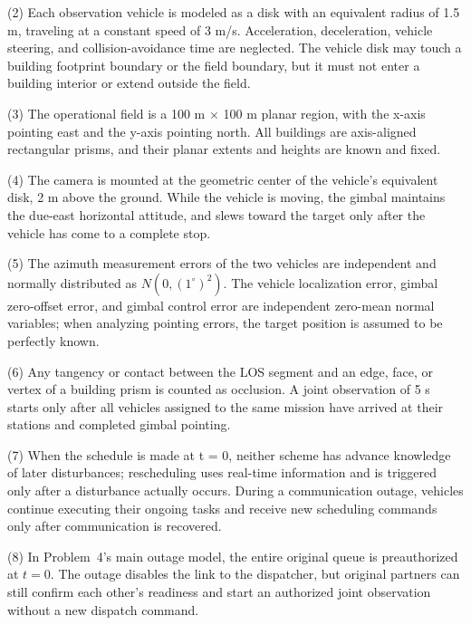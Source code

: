\documentclass{swmcmthesis}
\begin{document}
(2) Each observation vehicle is modeled as a disk with an equivalent radius of 1.5 m, traveling at a constant speed of 3 m/s. Acceleration, deceleration, vehicle steering, and collision-avoidance time are neglected. The vehicle disk may touch a building footprint boundary or the field boundary, but it must not enter a building interior or extend outside the field.

(3) The operational field is a 100 m × 100 m planar region, with the x-axis pointing east and the y-axis pointing north. All buildings are axis-aligned rectangular prisms, and their planar extents and heights are known and fixed.

(4) The camera is mounted at the geometric center of the vehicle's equivalent disk, 2 m above the ground. While the vehicle is moving, the gimbal maintains the due-east horizontal attitude, and slews toward the target only after the vehicle has come to a complete stop.

(5) The azimuth measurement errors of the two vehicles are independent and normally distributed as $N(0, (1^\circ)^2)$. The vehicle localization error, gimbal zero-offset error, and gimbal control error are independent zero-mean normal variables; when analyzing pointing errors, the target position is assumed to be perfectly known.

(6) Any tangency or contact between the LOS segment and an edge, face, or vertex of a building prism is counted as occlusion. A joint observation of 5 s starts only after all vehicles assigned to the same mission have arrived at their stations and completed gimbal pointing.

(7) When the schedule is made at t = 0, neither scheme has advance knowledge of later disturbances; rescheduling uses real-time information and is triggered only after a disturbance actually occurs. During a communication outage, vehicles continue executing their ongoing tasks and receive new scheduling commands only after communication is recovered.

(8) In Problem~4's main outage model, the entire original queue is preauthorized at \(t=0\). The outage disables the link to the dispatcher, but original partners can still confirm each other's readiness and start an authorized joint observation without a new dispatch command.
\end{document}
